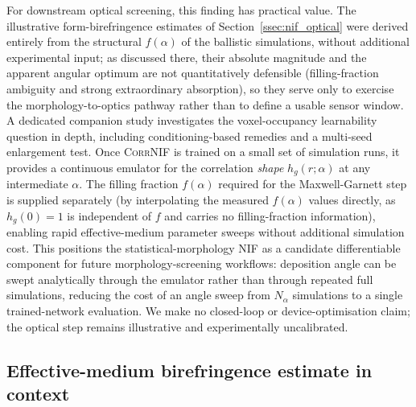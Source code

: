 \documentclass[aip,amsmath,amssymb,reprint]{revtex4-1}
\newcommand{\dang}{\ensuremath{\alpha}}
\begin{document}
For downstream optical screening, this finding has practical value.
The illustrative form-birefringence estimates of
Section~\ref{ssec:nif_optical} were derived entirely from the structural
$f(\dang)$ of the ballistic simulations, without additional experimental
input; as discussed there, their absolute magnitude and the apparent
angular optimum are not quantitatively defensible (filling-fraction
ambiguity and strong extraordinary absorption), so they serve only to
exercise the morphology-to-optics pathway rather than to define a usable
sensor window.
A dedicated companion study \citep{companionP2} investigates the voxel-occupancy
learnability question in depth, including conditioning-based remedies and a
multi-seed enlargement test.
Once \textsc{CorrNIF} is trained on a small set of simulation runs,
it provides a continuous emulator for the correlation \emph{shape}
$h_g(r;\dang)$ at any intermediate $\dang$.  The filling fraction
$f(\dang)$ required for the Maxwell-Garnett step is supplied separately
(by interpolating the measured $f(\dang)$ values directly, as
$h_g(0)=1$ is independent of $f$ and carries no filling-fraction
information), enabling rapid effective-medium parameter sweeps without
additional simulation cost.
This positions the statistical-morphology NIF as a candidate
differentiable component for future morphology-screening workflows:
deposition angle can be swept analytically through the emulator rather than
through repeated full simulations, reducing the cost of an angle sweep
from $N_{\dang}$ simulations to a single trained-network evaluation.  We
make no closed-loop or device-optimisation claim; the optical step remains
illustrative and experimentally uncalibrated.

\subsection{Effective-medium birefringence estimate in context}
\label{ssec:biref_context}
\end{document}
